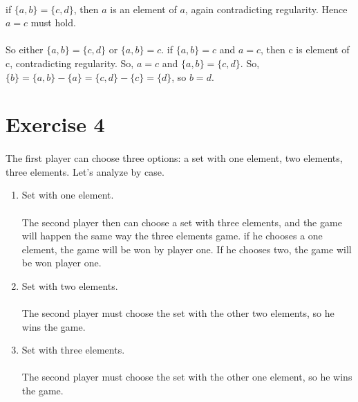 \documentclass{article}
\begin{document}
\begin{enumerate}[label=\alph*.]
        \paragraph{}
        if $\{a, b\} = \{c, d\}$, then $a$ is an element of $a$, again contradicting regularity.
        Hence $a = c$ must hold.

        \paragraph{}
        So either $\{a, b\} = \{c, d\}$ or $\{a, b\} = c$.
        if $\{a, b\} = c$ and $a = c$, then c is element of c, contradicting regularity.
        So, $a = c$ and $\{a, b\} = \{c, d\}$.
        So, $\{b\} = \{a, b\} - \{a\} = \{c, d\} - \{c\} = \{d\}$, so $b = d$.


\end{enumerate}

\section*{Exercise 4}
\paragraph{}
The first player can choose three options: a set with one element, two elements, three elements.
Let's analyze by case.
\begin{enumerate}[label=\alph*.]
  \item Set with one element.
        \paragraph{}
        The second player then can choose a set with three elements, and the game will happen the same way the three elements game.
        if he chooses a one element, the game will be won by player one.
        If he chooses two, the game will be won player one.

  \item Set with two elements.
        \paragraph{}
        The second player must choose the set with the other two elements, so he wins the game.
  \item Set with three elements.
        \paragraph{}
        The second player must choose the set with the other one element, so he wins the game.
\end{enumerate}
\end{document}
